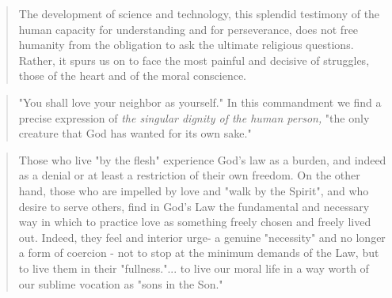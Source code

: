 \begin{quote}
  The development of science and technology, this splendid testimony of the human capacity for understanding and for perseverance, does not free humanity from the obligation to ask the ultimate religious questions. Rather, it spurs us on to face the most painful and decisive of struggles, those of the heart and of the moral conscience.
\end{quote}

\begin{quote}
  "You shall love your neighbor as yourself." In this commandment we find a precise expression of \textit{the singular dignity of the human person,} "the only creature that God has wanted for its own sake."
\end{quote}

\begin{quote}
  Those who live "by the flesh" experience God's law as a burden, and indeed as a denial or at least a restriction of their own freedom. On the other hand, those who are impelled by love and "walk by the Spirit", and who desire to serve others, find in God's Law the fundamental and necessary way in which to practice love as something freely chosen and freely lived out. Indeed, they feel and interior urge- a genuine "necessity" and no longer a form of coercion - not to stop at the minimum demands of the Law, but to live them in their "fullness."... to live our moral life in a way worth of our sublime vocation as "sons in the Son."
\end{quote}